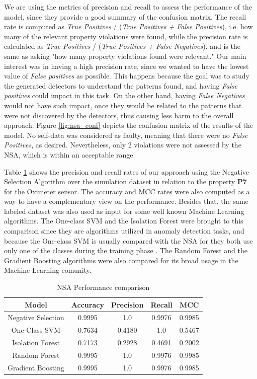 We are using the metrics of precision and recall to assess the performance of the model, since they provide a good summary of the confusion matrix. The recall rate is computed as \textit{True Positives} / (\textit{True Positives + False Positives}), i.e. how many of the relevant property violations were found, while the precision rate is calculated as \textit{True Positives} / (\textit{True Positives + False Negatives}), and is the same as asking "how many property violations found were relevant." Our main interest was in having a high precision rate, since we wanted to have the lowest value of \textit{False positives} as possible. This happens because the goal was to study the generated detectors to understand the patterns found, and having \textit{False positives} could impact in this task. On the other hand, having \textit{False Negatives} would not have such impact, once they would be related to the patterns that were not discovered by the detectors, thus causing less harm to the overall approach. Figure \ref{fig:nsa_conf} depicts the confusion matrix of the results of the model. No self-data was considered as faulty, meaning that there were no \textit{False Positives}, as desired. Nevertheless, only 2 violations were not assessed by the NSA, which is within an acceptable range.


Table \ref{tab:ev_comparison} shows the precision and recall rates of our approach using the Negative Selection Algorithm over the simulation dataset in relation to the property \textbf{P7} for the Oximeter sensor. The accuracy and MCC rates were also computed as a way to have a complementary view on the performance. Besides that, the same labeled dataset was also used as input for some well known Machine Learning algorithms. The One-class SVM and the Isolation Forest were brought to this comparison since they are algorithms utilized in anomaly detection tasks, and because the One-class SVM is usually compared with the NSA for they both use only one of the classes during the training phase \cite{NSAResearch2021}. The Random Forest and the Gradient Boosting algorithms were also compared for its broad usage in the Machine Learning comunity. 

\begin{table}[!h]
    \centering
    \begin{tabular}{ccccc}
    \hline
    Model              & Accuracy & Precision & Recall & MCC    \\ \hline
    Negative Selection & 0.9995   & 1.0       & 0.9976 & 0.9985 \\
    One-Class SVM      & 0.7634   & 0.4180    & 1.0    & 0.5467 \\
    Isolation Forest   & 0.7173   & 0.2928    & 0.4691 & 0.2002 \\
    Random Forest      & 0.9995   & 1.0       & 0.9976 & 0.9985 \\
    Gradient Boosting  & 0.9995   & 1.0       & 0.9976 & 0.9985 \\ \hline
    \end{tabular}
    \caption{NSA Performance comparison}
    \label{tab:ev_comparison}
\end{table}

